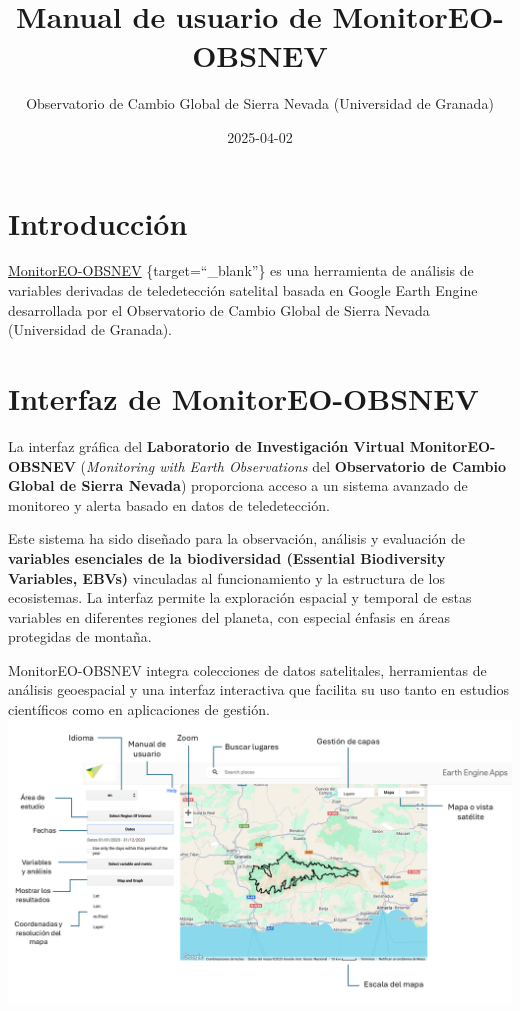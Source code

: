 \documentclass[
]{book}
\title{Manual de usuario de MonitorEO-OBSNEV}
\author{Observatorio de Cambio Global de Sierra Nevada (Universidad de Granada)}
\date{2025-04-02}
\begin{document}
\maketitle

{
\setcounter{tocdepth}{1}
\tableofcontents
}
\chapter{Introducción}\label{intro}

\href{https://sl.ugr.es/monitoreoobsnev}{MonitorEO-OBSNEV} \{target=``\_blank''\} es una herramienta de análisis de variables derivadas de teledetección satelital basada en Google Earth Engine desarrollada por el Observatorio de Cambio Global de Sierra Nevada (Universidad de Granada).

\chapter{Interfaz de MonitorEO-OBSNEV}\label{interfaz}

La interfaz gráfica del \textbf{Laboratorio de Investigación Virtual MonitorEO-OBSNEV} (\emph{Monitoring with Earth Observations} del \textbf{Observatorio de Cambio Global de Sierra Nevada}) proporciona acceso a un sistema avanzado de monitoreo y alerta basado en datos de teledetección.

Este sistema ha sido diseñado para la observación, análisis y evaluación de \textbf{variables esenciales de la biodiversidad (Essential Biodiversity Variables, EBVs)} vinculadas al funcionamiento y la estructura de los ecosistemas. La interfaz permite la exploración espacial y temporal de estas variables en diferentes regiones del planeta, con especial énfasis en áreas protegidas de montaña.

MonitorEO-OBSNEV integra colecciones de datos satelitales, herramientas de análisis geoespacial y una interfaz interactiva que facilita su uso tanto en estudios científicos como en aplicaciones de gestión.
\includegraphics{assets/InterfazMonitorEO_es.png}
\end{document}

